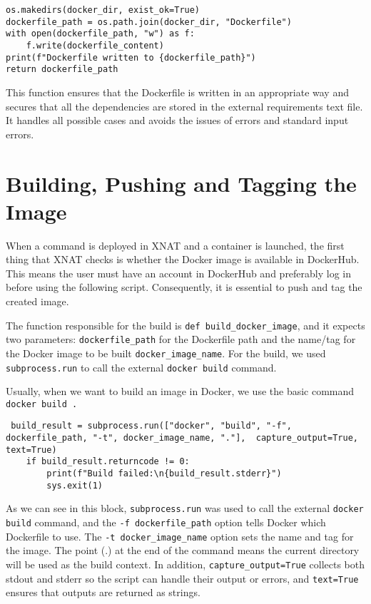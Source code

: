 \begin{lstlisting}
os.makedirs(docker_dir, exist_ok=True)
dockerfile_path = os.path.join(docker_dir, "Dockerfile")
with open(dockerfile_path, "w") as f:
    f.write(dockerfile_content)
print(f"Dockerfile written to {dockerfile_path}")
return dockerfile_path
\end{lstlisting}

This function ensures that the Dockerfile is written in an appropriate way and secures that all the dependencies are stored in the external requirements text file. It handles all possible cases and avoids the issues of errors and standard input errors.

\section{Building, Pushing and Tagging the Image}

When a command is deployed in XNAT and a container is launched, the first thing that XNAT checks is whether the Docker image is available in DockerHub. This means the user must have an account in DockerHub and preferably log in before using the following script. Consequently, it is essential to push and tag the created image.

The function responsible for the build is \texttt{def build\_docker\_image}, and it expects two parameters: \texttt{dockerfile\_path} for the Dockerfile path and the name/tag for the Docker image to be built \texttt{docker\_image\_name}. For the build, we used \texttt{subprocess.run} to call the external \texttt{docker build} command.


Usually, when we want to build an image in Docker, we use the basic command \texttt{docker build .}


\begin{lstlisting}
 build_result = subprocess.run(["docker", "build", "-f", dockerfile_path, "-t", docker_image_name, "."],  capture_output=True, text=True)
    if build_result.returncode != 0:
        print(f"Build failed:\n{build_result.stderr}")
        sys.exit(1)
\end{lstlisting}

As we can see in this block, \texttt{subprocess.run} was used to call the external \texttt{docker build} command, and the \texttt{-f dockerfile\_path} option tells Docker which Dockerfile to use. The \texttt{-t docker\_image\_name} option sets the name and tag for the image. The point (.) at the end of the command means the current directory will be used as the build context. In addition, \texttt{capture\_output=True} collects both stdout and stderr so the script can handle their output or errors, and \texttt{text=True} ensures that outputs are returned as strings.


